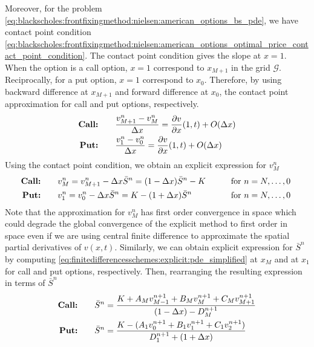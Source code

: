 Moreover, for the problem \eqref{eq:blackscholes:frontfixingmethod:nielsen:american_options_bs_pde}, we have contact point condition \eqref{eq:blackscholes:frontfixingmethod:nielsen:american_options_optimal_price_contact_point_condition}. The contact point condition gives the slope at $x=1$. When the option is a call option, $x=1$ correspond to $x_{M+1}$ in the grid $\mathcal{G}$. Reciprocally, for a put option, $x=1$ correspond to $x_0$. Therefore, by using backward difference at $x_{M+1}$ and forward difference at $x_0$, the contact point approximation for call and put options, respectively.
\begin{align*}
  \text{\textbf{Call:}} \qquad & \dfrac{v^{n}_{M+1} - v^{n}_{M}}{\Delta{x}} = \dfrac{\partial{v}}{\partial{x}}(1, t) + O(\Delta{x}) \\
  \text{\textbf{Put:}} \qquad & \dfrac{v^{n}_{1} - v^{n}_{0}}{\Delta{x}} = \dfrac{\partial{v}}{\partial{x}}(1, t)+ O(\Delta{x}) 
\end{align*}
Using the contact point condition, we obtain an explicit expression for $v^{n}_{M}$
\begin{subequations}
  \label{eq:finitedifferencesschemes:explicit:contact_point_approximation_2}
  \begin{align}
    \text{\textbf{Call:}} \qquad& v^{n}_{M} = v^{n}_{M+1} - \Delta{x}\bar{S}^{n} = (1-\Delta{x})\bar{S}^n - K & \qquad \text{for $n = N,\dots,0$ }\\
    \text{\textbf{Put:}} \qquad& v^{n}_{1} = v^{n}_{0} - \Delta{x}\bar{S}^{n} = K - (1+\Delta{x})\bar{S}^n & \qquad \text{for $n = N,\dots,0$ }
  \end{align}    
\end{subequations}
Note that the approximation for $v^{n}_{M}$ has first order convergence in space which could degrade the global convergence of the explicit method to first order in space even if we are using central finite difference to approximate the spatial partial derivatives of $v(x,t)$. Similarly, we can obtain explicit expression for $\bar{S}^{n}$ by computing \eqref{eq:finitedifferencesschemes:explicit:pde_simplified} at $x_M$ and at $x_1$ for call and put options, respectively. Then, rearranging the resulting expression in terms of $\bar{S}^n$ 
\begin{subequations}
  \label{eq:finitedifferencesschemes:explicit:optimal_exercise_price_approximation}
  \begin{align}
    \text{\textbf{Call:}} \qquad& \bar{S}^{n} = \dfrac{K + A_{M}v^{n+1}_{M-1} + B_{M}v^{n+1}_{M} + C_{M}v^{n+1}_{M+1}}{(1-\Delta{x}) - D^{n+1}_{M}} \\
    \text{\textbf{Put:}} \qquad& \bar{S}^{n} = \dfrac{K - (A_{1}v^{n+1}_{0} + B_{1}v^{n+1}_{1} + C_{1}v^{n+1}_{2})}{D^{n+1}_1 + (1+\Delta{x})}
  \end{align}
\end{subequations}
